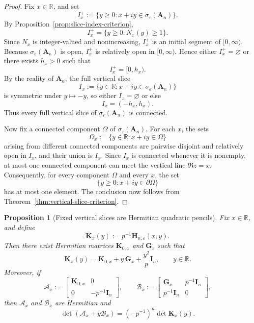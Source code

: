 \documentclass[11pt]{article}
\newtheorem{proposition}[theorem]{Proposition}
\begin{document}
\begin{proof}
Fix \(x\in\mathbb R\), and set
\[
I_x^+:=\{y\ge 0:x+iy\in \sigma_\varepsilon(\mathbf A_n)\}.
\]
By Proposition~\ref{prop:slice-index-criterion},
\[
I_x^+=\{y\ge 0:N_x(y)\ge 1\}.
\]
Since \(N_x\) is integer-valued and nonincreasing, \(I_x^+\) is an initial segment of \([0,\infty)\).
Because \(\sigma_\varepsilon(\mathbf A_n)\) is open, \(I_x^+\) is relatively open in \([0,\infty)\).
Hence either \(I_x^+=\varnothing\) or there exists \(h_x>0\) such that
\[
I_x^+=[0,h_x).
\]
By the reality of \(\mathbf A_n\), the full vertical slice
\[
I_x:=\{y\in\mathbb R:x+iy\in \sigma_\varepsilon(\mathbf A_n)\}
\]
is symmetric under \(y\mapsto -y\), so either \(I_x=\varnothing\) or else
\[
I_x=(-h_x,h_x).
\]
Thus every full vertical slice of \(\sigma_\varepsilon(\mathbf A_n)\) is connected.

Now fix a connected component \(\Omega\) of \(\sigma_\varepsilon(\mathbf A_n)\). For each \(x\),
the sets
\[
\Omega_x:=\{y\in\mathbb R:x+iy\in \Omega\}
\]
arising from different connected components are pairwise disjoint and relatively open in \(I_x\),
and their union is \(I_x\). Since \(I_x\) is connected whenever it is nonempty, at most one
connected component can meet the vertical line \(\Re z=x\). Consequently, for every component
\(\Omega\) and every \(x\), the set
\[
\{y\ge 0:x+iy\in \partial\Omega\}
\]
has at most one element. The conclusion now follows from
Theorem~\ref{thm:vertical-slice-criterion}.
\end{proof}

\begin{proposition}[Fixed vertical slices are Hermitian quadratic pencils]\label{prop:fixed-slice-quadratic-pencil}
Fix \(x\in\mathbb R\), and define
\[
\mathbf K_x(y):=p^{-1}\mathbf H_{n,\varepsilon}(x,y).
\]
Then there exist Hermitian matrices \(\mathbf K_{0,x}\) and \(\mathbf G_x\) such that
\[
\mathbf K_x(y)=\mathbf K_{0,x}+y\,\mathbf G_x+\frac{y^2}{p}\mathbf I_n,
\qquad y\in\mathbb R.
\]
Moreover, if
\[
\mathcal A_x:=
\begin{bmatrix}
\mathbf K_{0,x} & 0\\
0 & -p^{-1}\mathbf I_n
\end{bmatrix},
\qquad
\mathcal B_x:=
\begin{bmatrix}
\mathbf G_x & p^{-1}\mathbf I_n\\
p^{-1}\mathbf I_n & 0
\end{bmatrix},
\]
then \(\mathcal A_x\) and \(\mathcal B_x\) are Hermitian and
\[
\det(\mathcal A_x+y\mathcal B_x)
=
(-p^{-1})^n \det \mathbf K_x(y).
\]
\end{proposition}
\end{document}
